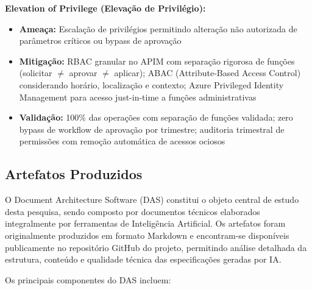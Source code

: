 \textbf{Elevation of Privilege (Elevação de Privilégio):}
\begin{itemize}
\item \textbf{Ameaça:} Escalação de privilégios permitindo alteração não autorizada de parâmetros críticos ou bypass de aprovação
\item \textbf{Mitigação:} RBAC granular no APIM com separação rigorosa de funções (solicitar $\neq$ aprovar $\neq$ aplicar); ABAC (Attribute-Based Access Control) considerando horário, localização e contexto; Azure Privileged Identity Management para acesso just-in-time a funções administrativas
\item \textbf{Validação:} 100\% das operações com separação de funções validada; zero bypass de workflow de aprovação por trimestre; auditoria trimestral de permissões com remoção automática de acessos ociosos
\end{itemize}

\subsection{Artefatos Produzidos}

O Document Architecture Software (DAS) constitui o objeto central de estudo desta pesquisa, sendo composto por documentos técnicos elaborados integralmente por ferramentas de Inteligência Artificial. Os artefatos foram originalmente produzidos em formato Markdown e encontram-se disponíveis publicamente no repositório GitHub do projeto, permitindo análise detalhada da estrutura, conteúdo e qualidade técnica das especificações geradas por IA.

Os principais componentes do DAS incluem:

